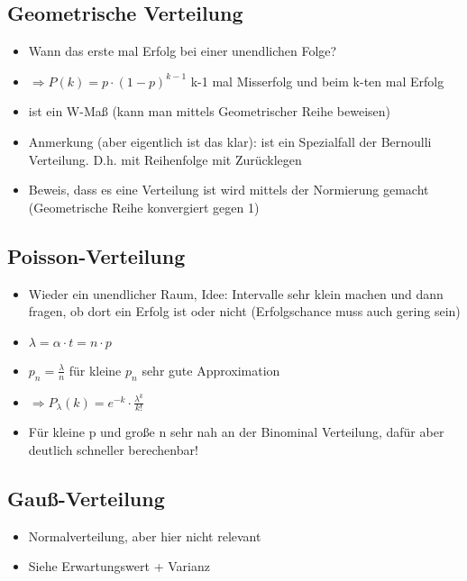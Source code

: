\documentclass[a4paper,11pt]{scrartcl}
\begin{document}
\subsection{Geometrische Verteilung}

\begin{itemize}
    \item Wann das erste mal Erfolg bei einer unendlichen Folge?
    \item $\Rightarrow P(k) = p \cdot (1-p)^{k-1}$ k-1 mal Misserfolg und beim k-ten mal Erfolg
    \item ist ein W-Maß (kann man mittels Geometrischer Reihe beweisen)
    \item Anmerkung (aber eigentlich ist das klar): ist ein Spezialfall der Bernoulli Verteilung. D.h. mit Reihenfolge mit Zurücklegen
    \item Beweis, dass es eine Verteilung ist wird mittels der Normierung gemacht (Geometrische Reihe konvergiert gegen 1)
\end{itemize}

\subsection{Poisson-Verteilung}

\begin{itemize}
    \item Wieder ein unendlicher Raum, Idee: Intervalle sehr klein machen und dann fragen, ob dort ein Erfolg ist oder nicht (Erfolgschance muss auch gering sein)
    \item $\lambda= \alpha \cdot t = n \cdot p$
    \item $p_n = \frac{\lambda}{n}$ für kleine $p_n$ sehr gute Approximation
    \item $\Rightarrow P_\lambda (k) = e^{-k} \cdot \frac{\lambda^k}{k!}$
    \item Für kleine p und große n sehr nah an der Binominal Verteilung, dafür aber deutlich schneller berechenbar!
\end{itemize}

\subsection{Gauß-Verteilung}

\begin{itemize}
    \item Normalverteilung, aber hier nicht relevant
    \item Siehe Erwartungswert + Varianz
\end{itemize}
\end{document}
